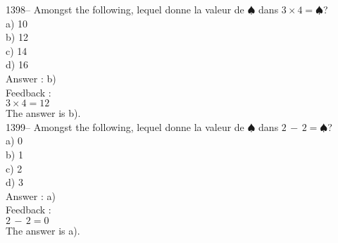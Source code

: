 \documentclass[letterpaper, 12pt]{article}
\begin{document}
1398-- Amongst the following, lequel donne la valeur de
$\spadesuit$ dans $3\times4=\spadesuit$?\\
a) 10\\
b) 12\\
c) 14\\
d) 16\\

Answer : b)\\

Feedback : \\
$3\times4=12$\\
The answer is b).\\

1399-- Amongst the following, lequel donne la valeur de
$\spadesuit$ dans $2\,-\,2=\spadesuit$?\\
a) 0\\
b) 1\\
c) 2\\
d) 3\\

Answer : a)\\

Feedback : \\
$2\,-\,2=0$\\
The answer is a).\\
\end{document}
